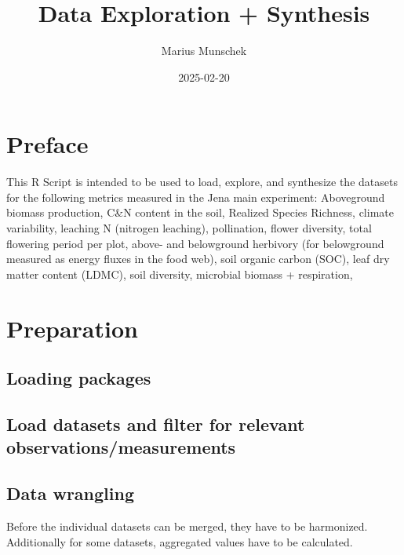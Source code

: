 \documentclass[
]{article}
\title{Data Exploration + Synthesis}
\author{Marius Munschek}
\date{2025-02-20}
\begin{document}
\maketitle

\section{Preface}\label{preface}

This R Script is intended to be used to load, explore, and synthesize
the datasets for the following metrics measured in the Jena main
experiment: Aboveground biomass production, C\&N content in the soil,
Realized Species Richness, climate variability, leaching N (nitrogen
leaching), pollination, flower diversity, total flowering period per
plot, above- and belowground herbivory (for belowground measured as
energy fluxes in the food web), soil organic carbon (SOC), leaf dry
matter content (LDMC), soil diversity, microbial biomass + respiration,

\section{Preparation}\label{preparation}

\subsection{Loading packages}\label{loading-packages}

\subsection{Load datasets and filter for relevant
observations/measurements}\label{load-datasets-and-filter-for-relevant-observationsmeasurements}

\subsection{Data wrangling}\label{data-wrangling}

Before the individual datasets can be merged, they have to be
harmonized. Additionally for some datasets, aggregated values have to be
calculated.
\end{document}
